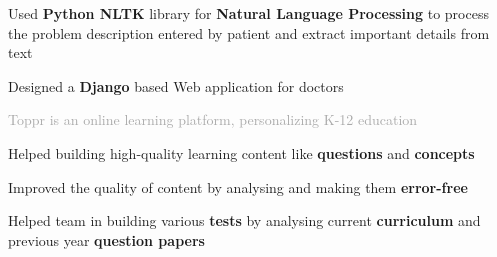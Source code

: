 \begin{cventries}
{\begin{cvitems}
        \vspace{0.3mm}
        \item {Used \textbf{Python NLTK} library for \textbf{Natural Language Processing} to process the problem description entered by patient and extract important details from text}
        \vspace{0.3mm}
        \item {Designed a \textbf{Django} based Web application for doctors}
      \end{cvitems}
    }
  \cventry
    {}
    {}
    {}
    {}
    {  
      {\fontsize{9.5pt}{1em}\descriptionfont\textcolor{darkgray}{Toppr is an online learning platform, personalizing K-12 education}}
      \vspace{4mm}
      \begin{cvitems}
        \item Helped building high-quality learning content like \textbf{questions} and \textbf{concepts} 
        \item Improved the quality of content by analysing and making them \textbf{error-free}
        \item Helped team in building various \textbf{tests} by analysing current \textbf{curriculum} and previous year \textbf{question papers}
      \end{cvitems}
    }
\end{cventries}
